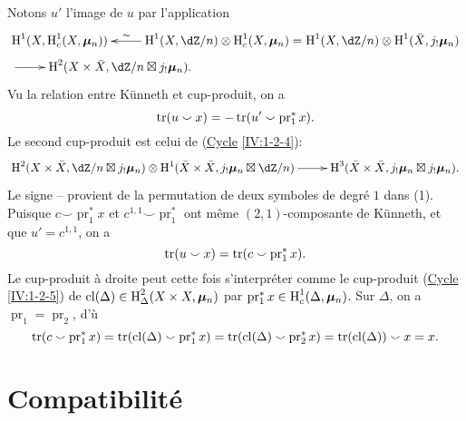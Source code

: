 Notons $u'$ l'image de $u$ par l'application 
\begin{align*}
&\xymatrix{
  \h^1(X,\h_c^1(X,\dmu_n)) 
    & \ar[l]_-\sim \h^1(X,\dZ/n) \otimes \h_c^1(X,\dmu_n) = \h^1(X,\dZ/n)\otimes \h^1(\bar X,j_!\dmu_n)
} \\
&\xymatrix{
  \ar[r] 
    & \h^2(X\times \bar X,\dZ/n\boxtimes j_!\dmu_n) \text{.}
}
\end{align*}
Vu la relation entre K\"unneth et cup-produit, on a 
\[
  \operatorname{tr}(u\smallsmile x) = -\operatorname{tr}(u'\smallsmile \operatorname{pr}_1^\ast x) \text{.}
\]
Le second cup-produit est celui de (\hyperref[IV]{Cycle} \ref{IV:1-2-4}):
\[\xymatrix{
  \h^2(X\times \bar X,\dZ/n\boxtimes j_!\dmu_n) \otimes \h^1(\bar X\times \bar X,j_!\dmu_n\boxtimes \dZ/n) \ar[r] 
    & \h^3(\bar X\times \bar X,j_!\dmu_n \boxtimes j_!\dmu_n) \text{.}
}\]
Le signe -- provient de la permutation de deux symboles de degré $1$ dans 
(1). Puisque $c\smallsmile\operatorname{pr}_1^\ast x$ et 
$c^{1,1}\smallsmile \operatorname{pr}_1^\ast$ ont même $(2,1)$-composante de 
K\"unneth, et que $u'=c^{1,1}$, on a 
\[
  \operatorname{tr}(u\smallsmile x) = \operatorname{tr}(c\smallsmile \operatorname{pr}_1^\ast x) \text{.}
\]
Le cup-produit à droite peut cette fois s'interpréter comme le 
cup-produit (\hyperref[IV]{Cycle} \ref{IV:1-2-5}) de 
$\operatorname{cl}(\Delta)\in \operatorname{H}_\Delta^2(X\times X,{\bm\mu}_n)$ par 
$\operatorname{pr}_1^\ast x\in \operatorname{H}_c^1(\Delta,{\bm\mu}_n)$. Sur $\Delta$, on a 
$\operatorname{pr}_1=\operatorname{pr}_2$, d'ù 
\[
  \operatorname{tr}(c\smallsmile \operatorname{pr}_1^\ast x) = \operatorname{tr}(\operatorname{cl}(\Delta)\smallsmile \operatorname{pr}_1^\ast x) = \operatorname{tr}(\operatorname{cl}(\Delta)\smallsmile \operatorname{pr}_2^\ast x) = \operatorname{tr}(\operatorname{cl}(\Delta))\smallsmile x = x \text{.}
\]










\section{Compatibilité \texorpdfstring{\cite[XVIII 3.1.10.3]{sga4}}{[SGA 4, XVIII 3.1.10.3]}}

